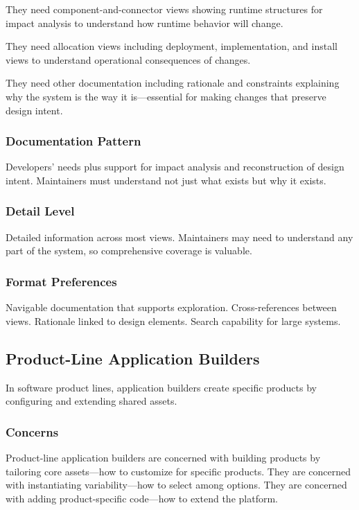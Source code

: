\documentclass[11pt]{article}
\begin{document}
They need component-and-connector views showing runtime structures for impact analysis to understand how runtime behavior will change.

They need allocation views including deployment, implementation, and install views to understand operational consequences of changes.

They need other documentation including rationale and constraints explaining why the system is the way it is---essential for making changes that preserve design intent.

\subsubsection{Documentation Pattern}

Developers' needs plus support for impact analysis and reconstruction of design intent. Maintainers must understand not just what exists but why it exists.

\subsubsection{Detail Level}

Detailed information across most views. Maintainers may need to understand any part of the system, so comprehensive coverage is valuable.

\subsubsection{Format Preferences}

Navigable documentation that supports exploration. Cross-references between views. Rationale linked to design elements. Search capability for large systems.

\subsection{Product-Line Application Builders}

In software product lines, application builders create specific products by configuring and extending shared assets.

\subsubsection{Concerns}

Product-line application builders are concerned with building products by tailoring core assets---how to customize for specific products. They are concerned with instantiating variability---how to select among options. They are concerned with adding product-specific code---how to extend the platform.
\end{document}
